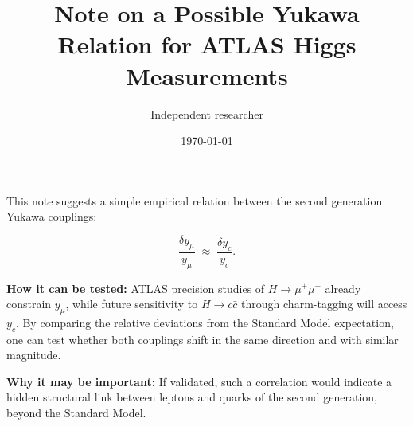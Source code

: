 \documentclass[12pt,a4paper]{article}
\title{Note on a Possible Yukawa Relation for ATLAS Higgs Measurements}
\author{Independent researcher}
\date{\today}
\begin{document}
\maketitle

\noindent
This note suggests a simple empirical relation between the second generation Yukawa couplings:

\[
\frac{\delta y_\mu}{y_\mu} \;\approx\; \frac{\delta y_c}{y_c}.
\]

\textbf{How it can be tested:}  
ATLAS precision studies of $H\to \mu^+\mu^-$ already constrain $y_\mu$, while future sensitivity to $H\to c\bar c$ through charm-tagging will access $y_c$. By comparing the relative deviations from the Standard Model expectation, one can test whether both couplings shift in the same direction and with similar magnitude.

\textbf{Why it may be important:}  
If validated, such a correlation would indicate a hidden structural link between leptons and quarks of the second generation, beyond the Standard Model.
\end{document}
